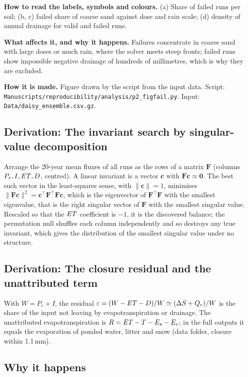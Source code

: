 \textbf{How to read the labels, symbols and colours.} (a) Share of failed runs per soil; (b, c) failed share of coarse sand against dose and rain scale; (d) density of annual drainage for valid and failed runs.

\textbf{What affects it, and why it happens.} Failures concentrate in coarse sand with large doses or much rain, where the solver meets steep fronts; failed runs show impossible negative drainage of hundreds of millimetres, which is why they are excluded.

\textbf{How it is made.} Figure drawn by the script from the input data. Script: \nolinkurl{Manuscripts/reproducibility/analysis/p2_figfail.py}. Input: \nolinkurl{Data/daisy_ensemble.csv.gz}.


\subsection{Derivation: The invariant search by singular-value decomposition}\label{der:s1:6}
Arrange the 20-year mean fluxes of all runs as the rows of a matrix $\mathbf F$ (columns $P_r,I,\mathit{ET},D$, centred). A linear invariant is a vector $\mathbf c$ with $\mathbf F\mathbf c\approx\mathbf 0$. The best such vector in the least-squares sense, with $\|\mathbf c\|=1$, minimises $\|\mathbf F\mathbf c\|^2=\mathbf c^\top\mathbf F^\top\mathbf F\mathbf c$, which is the eigenvector of $\mathbf F^\top\mathbf F$ with the smallest eigenvalue, that is the right singular vector of $\mathbf F$ with the smallest singular value. Rescaled so that the $\mathit{ET}$ coefficient is $-1$, it is the discovered balance; the permutation null shuffles each column independently and so destroys any true invariant, which gives the distribution of the smallest singular value under no structure.


\subsection{Derivation: The closure residual and the unattributed term}\label{der:s1:7}
With $W=P_r+I$, the residual $\varepsilon=(W-\mathit{ET}-D)/W\simeq(\Delta S+Q_r)/W$ is the share of the input not leaving by evapotranspiration or drainage. The unattributed evapotranspiration is $R=\mathit{ET}-T-E_s-E_c$; in the full outputs it equals the evaporation of ponded water, litter and snow (data folder, closure within 1.1\,mm).


\subsection{Why it happens}
